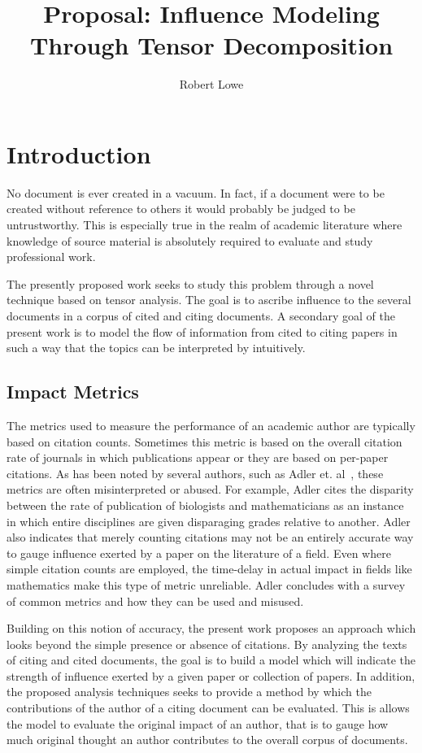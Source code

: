 \documentclass{article}
\title{Proposal: Influence Modeling Through Tensor Decomposition}
\author{Robert Lowe}
\begin{document}
\maketitle

\section{Introduction}
No document is ever created in a vacuum.  In fact, if a document were
to be created without reference to others it would probably be judged
to be untrustworthy.  This is especially true in the realm of
academic literature where knowledge of source material is absolutely
required to evaluate and study professional work. 

The presently proposed work seeks to study this problem through
a novel technique based on tensor analysis.  The goal is to ascribe
influence to the several documents in a corpus of cited and citing
documents. A secondary goal of the present work is to model the flow
of information from cited to citing papers in such a way that the
topics can be interpreted by intuitively.

\subsection{Impact Metrics}
The metrics used to measure the performance of an academic author are
typically based on citation counts.  Sometimes this metric is based on
the overall citation rate of journals in which publications appear or
they are based on per-paper citations.  As has been noted by several
authors, such as Adler et. al~\cite{adler2009}, these metrics are
often misinterpreted or abused.  For example, Adler cites the
disparity between the rate of publication of biologists and
mathematicians as an instance in which entire disciplines are given
disparaging grades relative to another. Adler also indicates that
merely counting citations may not be an entirely accurate way to gauge
influence exerted by a paper on the literature of a field.  Even where
simple citation counts are employed, the time-delay in actual impact
in fields like mathematics make this type of metric unreliable.  Adler
concludes with a survey of common metrics and how they can be used and
misused.

Building on this notion of accuracy, the present work proposes an
approach which looks beyond the simple presence or absence of
citations.  By analyzing the texts of citing and cited documents, the
goal is to build a model which will indicate the strength of influence
exerted by a given paper or collection of papers.  In addition, the
proposed analysis techniques seeks to provide a method by which the
contributions of the author of a citing document can be evaluated.
This is allows the model to evaluate the original impact of an author,
that is to gauge how much original thought an author contributes to
the overall corpus of documents. 
\end{document}
